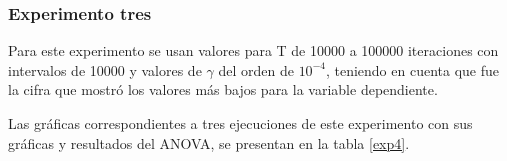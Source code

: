 \subsubsection{Experimento tres}


Para este experimento se usan valores para T de 10000 a 100000 iteraciones con intervalos de 10000 y valores de $\gamma$ del orden de $10^{-4}$, teniendo en cuenta que fue la cifra que mostró los valores más bajos para la variable dependiente. 

Las gráficas correspondientes a tres ejecuciones de este experimento con sus gráficas y resultados del ANOVA, se presentan en la tabla \ref{exp4}.

